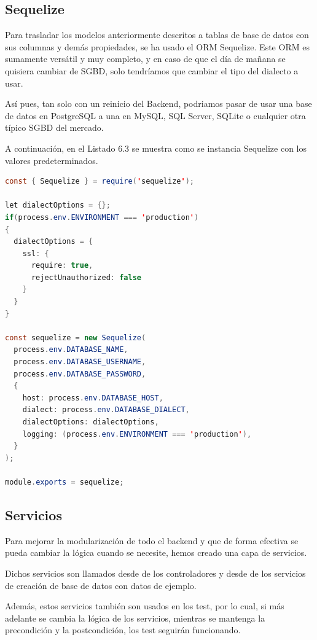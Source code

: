 \subsection{Sequelize}
Para trasladar los modelos anteriormente descritos a tablas de base de datos con sus columnas y demás propiedades, se ha usado el ORM Sequelize. Este ORM es sumamente versátil y muy completo, y en caso de que el día de mañana se quisiera cambiar de SGBD, solo tendríamos que cambiar el tipo del dialecto a usar.

Así pues, tan solo con un reinicio del Backend, podriamos pasar de usar una base de datos en PostgreSQL a una en MySQL, SQL Server, SQLite o cualquier otra típico SGBD del mercado.

A continuación, en el Listado 6.3 se muestra como se instancia Sequelize con los valores predeterminados.

\begin{lstlisting}[language=Java,caption={Creación de instancia de Sequelize},captionpos=b]
const { Sequelize } = require('sequelize');

let dialectOptions = {};
if(process.env.ENVIRONMENT === 'production')
{
  dialectOptions = {
    ssl: {
      require: true,
      rejectUnauthorized: false
    }
  }
}

const sequelize = new Sequelize(
  process.env.DATABASE_NAME,
  process.env.DATABASE_USERNAME,
  process.env.DATABASE_PASSWORD,
  {
    host: process.env.DATABASE_HOST,
    dialect: process.env.DATABASE_DIALECT,
    dialectOptions: dialectOptions,
    logging: (process.env.ENVIRONMENT === 'production'),
  }
);

module.exports = sequelize;
\end{lstlisting}

\subsection{Servicios}
Para mejorar la modularización de todo el backend y que de forma efectiva se pueda cambiar la lógica cuando se necesite, hemos creado una capa de servicios.

Dichos servicios son llamados desde de los controladores y desde de los servicios de creación de base de datos con datos de ejemplo.

Además, estos servicios también son usados en los test, por lo cual, si más adelante se cambia la lógica de los servicios, mientras se mantenga la precondición y la postcondición, los test seguirán funcionando.

